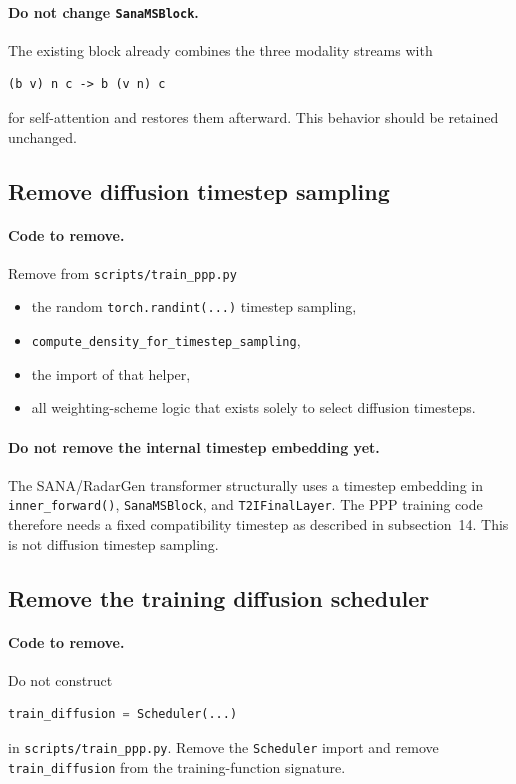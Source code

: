 \documentclass[11pt,a4paper]{article}
\begin{document}
\paragraph{Do not change \texttt{SanaMSBlock}.}
The existing block already combines the three modality streams with
\begin{lstlisting}
(b v) n c -> b (v n) c
\end{lstlisting}
for self-attention and restores them afterward. This behavior should be retained unchanged.

\subsection{Remove diffusion timestep sampling}

\paragraph{Code to remove.}
Remove from \texttt{scripts/train\_ppp.py}
\begin{itemize}
    \item the random \texttt{torch.randint(...)} timestep sampling,
    \item \texttt{compute\_density\_for\_timestep\_sampling},
    \item the import of that helper,
    \item all weighting-scheme logic that exists solely to select diffusion timesteps.
\end{itemize}

\paragraph{Do not remove the internal timestep embedding yet.}
The SANA/RadarGen transformer structurally uses a timestep embedding in \texttt{inner\_forward()}, \texttt{SanaMSBlock}, and \texttt{T2IFinalLayer}. The PPP training code therefore needs a fixed compatibility timestep as described in subsection~14. This is not diffusion timestep sampling.

\subsection{Remove the training diffusion scheduler}

\paragraph{Code to remove.}
Do not construct
\begin{lstlisting}[language=Python]
train_diffusion = Scheduler(...)
\end{lstlisting}
in \texttt{scripts/train\_ppp.py}. Remove the \texttt{Scheduler} import and remove \texttt{train\_diffusion} from the training-function signature.
\end{document}
